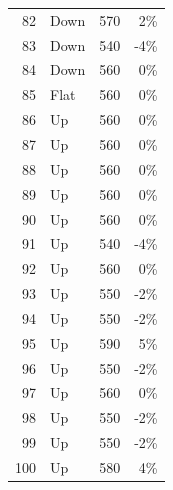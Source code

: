 \documentclass{scrartcl}
\begin{document}
\begin{longtable}{|r|l|r|r|}
		82    & Down  & 570   & 2\%     \\
		83    & Down  & 540   & -4\%    \\
		84    & Down  & 560   & 0\%     \\
		85    & Flat  & 560   & 0\%     \\
		86    & Up    & 560   & 0\%     \\
		87    & Up    & 560   & 0\%     \\
		88    & Up    & 560   & 0\%     \\
		89    & Up    & 560   & 0\%     \\
		90    & Up    & 560   & 0\%     \\
		91    & Up    & 540   & -4\%    \\
		92    & Up    & 560   & 0\%     \\
		93    & Up    & 550   & -2\%    \\
		94    & Up    & 550   & -2\%    \\
		95    & Up    & 590   & \cellcolor[rgb]{ 1,  .922,  .612}\textcolor[rgb]{ .612,  .341,  0}{5\%}   \\
		96    & Up    & 550   & -2\%    \\
		97    & Up    & 560   & 0\%     \\
		98    & Up    & 550   & -2\%    \\
		99    & Up    & 550   & -2\%    \\
		100   & Up    & 580   & 4\%     \\
	\end{longtable}%
\label{tab:addlabel}%
\end{document}
